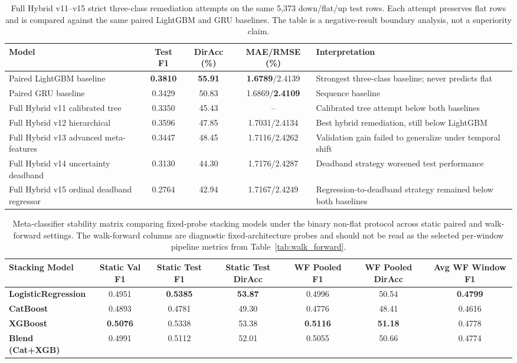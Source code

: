 \begin{table}[htbp]
\centering
\setlength{\tabcolsep}{3pt}
\caption{Full Hybrid v11--v15 strict three-class remediation attempts on the same 5,373 down/flat/up test rows. Each attempt preserves flat rows and is compared against the same paired LightGBM and GRU baselines. The table is a negative-result boundary analysis, not a superiority claim.}
\label{tab:three_class_negative_sweep}
\small
\begin{tabular}{p{4.4cm}ccc p{4.2cm}}
\toprule
Model & Test F1 & DirAcc (\%) & MAE/RMSE (\%) & Interpretation \\
\midrule
Paired LightGBM baseline & \textbf{0.3810} & \textbf{55.91} & \textbf{1.6789}/2.4139 & Strongest three-class baseline; never predicts flat \\
Paired GRU baseline & 0.3429 & 50.83 & 1.6869/\textbf{2.4109} & Sequence baseline \\
Full Hybrid v11 calibrated tree & 0.3350 & 45.43 & -- & Calibrated tree attempt below both baselines \\
Full Hybrid v12 hierarchical & 0.3596 & 47.85 & 1.7031/2.4134 & Best hybrid remediation, still below LightGBM \\
Full Hybrid v13 advanced meta-features & 0.3447 & 48.45 & 1.7116/2.4262 & Validation gain failed to generalize under temporal shift \\
Full Hybrid v14 uncertainty deadband & 0.3130 & 44.30 & 1.7176/2.4287 & Deadband strategy worsened test performance \\
Full Hybrid v15 ordinal deadband regressor & 0.2764 & 42.94 & 1.7167/2.4249 & Regression-to-deadband strategy remained below both baselines \\
\bottomrule
\end{tabular}
\end{table}

\begin{table}[htbp]
\centering
\setlength{\tabcolsep}{3pt}
\caption{Meta-classifier stability matrix comparing fixed-probe stacking models under the binary non-flat protocol across static paired and walk-forward settings. The walk-forward columns are diagnostic fixed-architecture probes and should not be read as the selected per-window pipeline metrics from Table~\ref{tab:walk_forward}.}
\label{tab:stability_matrix}
\small
\begin{tabular}{lcccccc}
\toprule
Stacking Model & Static Val F1 & Static Test F1 & Static Test DirAcc & WF Pooled F1 & WF Pooled DirAcc & Avg WF Window F1 \\
\midrule
\textbf{LogisticRegression} & 0.4951 & \textbf{0.5385} & \textbf{53.87} & 0.4996 & 50.54 & \textbf{0.4799} \\
\textbf{CatBoost} & 0.4893 & 0.4781 & 49.30 & 0.4776 & 48.41 & 0.4616 \\
\textbf{XGBoost} & \textbf{0.5076} & 0.5338 & 53.38 & \textbf{0.5116} & \textbf{51.18} & 0.4778 \\
\textbf{Blend (Cat+XGB)} & 0.4991 & 0.5112 & 52.01 & 0.5055 & 50.66 & 0.4774 \\
\bottomrule
\end{tabular}
\end{table}

